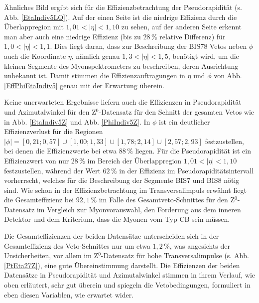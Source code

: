 Ähnliches Bild ergibt sich für die Effizienzbetrachtung der Pseudorapidität (s. Abb. \ref{EtaIndiv5LQ}). Auf der einen Seite ist die niedrige Effizienz durch die Überlappregion mit $1{,}01<|\eta|<1{,}10$ zu sehen, auf der anderen Seite erkennt man aber auch eine niedrige Effizienz (bis zu $28\,\%$ relative Differenz) für $1{,}0<|\eta|<1{,}1$. Dies liegt daran, dass zur Beschreibung der BIS78 Vetos neben $\phi$ auch die Koordinate $\eta$, nämlich genau $1{,}3<|\eta|<1{,}5$, benötigt wird, um die kleinen Segmente des Myonspektrometers zu beschreiben, deren Ausrichtung unbekannt ist. Damit stimmen die Effizienzauftragungen in $\eta$ und $\phi$ von Abb. \ref{EffPhiEtaIndiv5} genau mit der Erwartung überein. 

Keine unerwarteten Ergebnisse liefern auch die Effizienzen in Pseudorapidität und Azimutalwinkel für den Z$^0$-Datensatz für den Schnitt der gesamten Vetos wie in Abb. \ref{EtaIndiv5Z} und Abb. \ref{PhiIndiv5Z}. In $\phi$ ist ein deutlicher Effizienzverlust für die Regionen $|\phi|=[0,21;0,57]\cup[1,00;1,33]\cup[1,78;2,14]\cup[2,57;2,93]$ festzustellen, bei denen die Effizienzwerte bei etwa $88\,\%$ liegen. Für die Pseudorapidität ist ein Effizienzwert von nur $28\,\%$ im Bereich der Überlappregion $1{,}01<|\eta|<1{,}10$ festzustellen, während der Wert $62\,\%$ in der Effizienz im Pseudorapiditätsintervall vorherrscht, welches für die Beschreibung der Segmente BIS7 und BIS8 nötig sind. Wie schon in der Effizienzbetrachtung im Transversalimpuls erwähnt liegt die Gesamteffizienz bei $92,1\,\%$ im Falle des Gesamtveto-Schnittes für den Z$^0$-Datensatz im Vergleich zur Myonvorauswahl, den Forderung aus dem inneren Detektor und dem Kriterium, dass die Myonen vom Typ CB sein müssen.

Die Gesamteffizienzen der beiden Datensätze unterscheiden sich in der Gesamteffizienz des Veto-Schnittes nur um etwa $1,2\,\%$, was angesichts der Unsicherheiten, vor allem im Z$^0$-Datensatz für hohe Transversalimpulse (s. Abb. \ref{PtEta27Z}), eine gute Übereinstimmung darstellt. Die Effizienzen der beiden Datensätze in Pseudorapidität und Azimutalwinkel stimmen in ihrem Verlauf, wie oben erläutert, sehr gut überein und spiegeln die Vetobedingungen, formuliert in eben diesen Variablen, wie erwartet wider.
 
